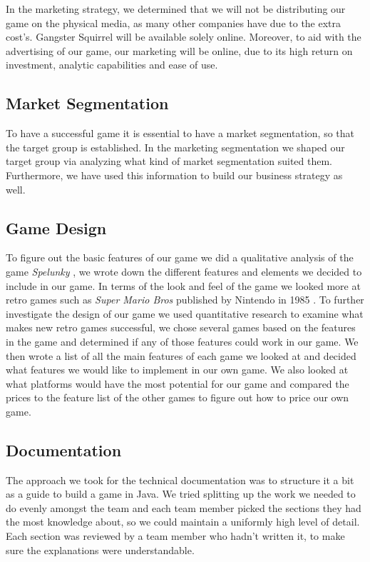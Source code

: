 \documentclass[12p]{article}
\begin{document}
In the marketing strategy, we determined that we will not be distributing our game on the physical media, as many other companies have due to the extra cost's. Gangster Squirrel will be available solely online. Moreover, to aid with the advertising of our game, our marketing will be online, due to
its high return on investment, analytic capabilities and ease of use.

\subsection{Market Segmentation}
To have a successful game it is essential to have a market segmentation, so that the target group is established. In the marketing segmentation we shaped our target group via analyzing what kind of market segmentation suited them. Furthermore, we have used this information to build our business strategy as well. 

\subsection{Game Design}

To figure out the basic features of our game we did a qualitative analysis of the game \emph{Spelunky} \cite{Spelunky}, we wrote down the different features and elements we decided to include in our game. In terms of the look and feel of the game we looked more at retro games such as \emph{Super Mario Bros} published by Nintendo in 1985 \cite{SuperMarioBros}. To further investigate the design of our game we used quantitative research to examine what makes new retro games successful, we chose several games based on the features in the game and determined if any of those features could work in our game. We then wrote a list of all the main features of each game we looked at and decided what features we would like to implement in our own game. We also looked at what platforms would have the most potential for our game and compared the prices to the feature list of the other games to figure out how to price our own game.

\subsection{Documentation}
The approach we took for the technical documentation was to structure it a bit as a guide to build a game in Java. We tried splitting up the work we needed to do evenly amongst the team and each team member picked the sections they had the most knowledge about, so we could maintain a uniformly high level of detail. Each section was reviewed by a team member who hadn't written it, to make sure the explanations were understandable.
\end{document}

